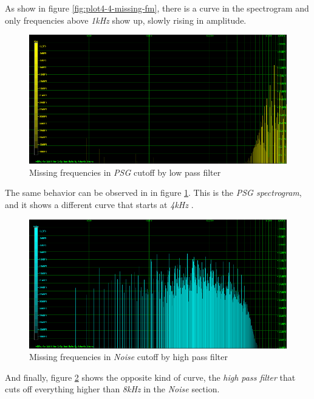 \documentclass[10pt,a4paper]{report}
\begin{document}
As show in figure \ref{fig:plot4-4-missing-fm}, there is a curve in the spectrogram and only frequencies above \textit{1kHz} show up, slowly rising in amplitude.

\begin{figure}[H]
	\centering
	\includegraphics[width=1.0\linewidth]{images/interpretation/Plot4-5-Missing-PSG.png}
	\caption[Missing PSG]{Missing frequencies in \textit{PSG} cutoff by low pass filter}
	\label{fig:plot4-5-missing-psg}
\end{figure}

The same behavior can be observed in in figure \ref{fig:plot4-5-missing-psg}. This is the \textit{PSG spectrogram}, and it shows a different curve that starts at \textit{4kHz} .

\begin{figure}[H]
	\centering
	\includegraphics[width=1.0\linewidth]{images/interpretation/Plot4-6-Missing-Noise.png}
	\caption[Missing Noise]{Missing frequencies in \textit{Noise} cutoff by high pass filter}
	\label{fig:plot4-6-missing-noise}
\end{figure}

And finally, figure \ref{fig:plot4-6-missing-noise} shows the opposite kind of curve, the \textit{high pass filter} that cuts off everything higher than \textit{8kHz} in the \textit{Noise} section.
\end{document}
